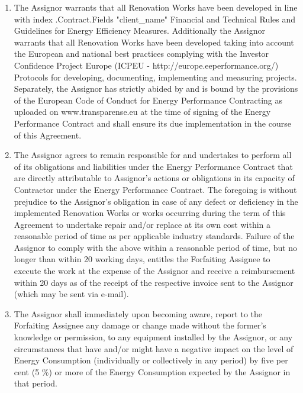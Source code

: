 \documentclass[a4paper]{article}
\begin{document}
\begin{multicols}{2}
\begin{enumerate}
  \item{The Assignor warrants that all Renovation Works have been
      developed in line with {{index .Contract.Fields "client_name"}} Financial and Technical Rules and
      Guidelines for Energy Efficiency Measures. Additionally the
      Assignor warrants that all Renovation Works have been developed
      taking into account the European and national best practices
      complying with the Investor Confidence Project Europe (ICPEU {-}
      http://europe.eeperformance.org/) Protocols for developing,
      documenting, implementing and measuring projects. Separately,
      the Assignor has strictly abided by and is bound by the
      provisions of the European Code of Conduct for Energy
      Performance Contracting as uploaded on www.transparense.eu at
      the time of signing of the Energy Performance Contract and shall
      ensure its due implementation in the course of this Agreement.}

  \item{The Assignor agrees to remain responsible for and undertakes
      to perform all of its obligations and liabilities under the
      Energy Performance Contract that are directly attributable to
      Assignor’s actions or obligations in its capacity of Contractor
      under the Energy Performance Contract. The foregoing is without
      prejudice to the Assignor’s obligation in case of any defect or
      deficiency in the implemented Renovation Works or works
      occurring during the term of this Agreement to undertake repair
      and/or replace at its own cost within a reasonable period of
      time as per applicable industry standards. Failure of the
      Assignor to comply with the above within a reasonable period of
      time, but no longer than within 20 working days, entitles the
      Forfaiting Assignee to execute the work at the expense of the
      Assignor and receive a reimbursement within 20 days as of the
      receipt of the respective invoice sent to the Assignor (which
      may be sent via e{-}mail).}

  \item{The Assignor shall immediately upon becoming aware, report to
      the Forfaiting Assignee any damage or change made without the
      former’s knowledge or permission, to any equipment installed by
      the Assignor, or any circumstances that have and/or might have a
      negative impact on the level of Energy Consumption (individually
      or collectively in any period) by five per cent (5 \%) or more
      of the Energy Consumption expected by the Assignor in that
      period.}


\end{enumerate}
\end{multicols}
\end{document}
